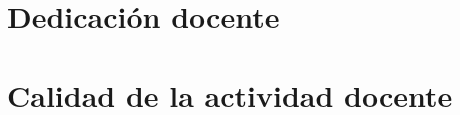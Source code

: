 
\section{Dedicación docente}
\cleardoublepage


\section{Calidad de la actividad docente}
\cleardoublepage

